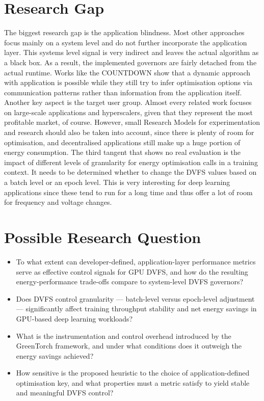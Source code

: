 \documentclass[12pt]{article}
\begin{document}
\section{Research Gap}
The biggest research gap is the application blindness. Most other approaches focus mainly on a system level and do not further incorporate the application layer. This systems level signal is very indirect and leaves the actual algorithm as a black box. As a result, the implemented governors are fairly detached from the actual runtime. Works like the COUNTDOWN show that a dynamic approach with application is possible while they still try to infer optimisation options via communication patterns rather than information from the application itself.\newline
Another key aspect is the target user group. Almost every related work focuses on large-scale applications and hyperscalers, given that they represent the most profitable market, of course. However, small Research Models for experimentation and research should also be taken into account, since there is plenty of room for optimisation, and decentralised applications still make up a huge portion of energy consumption.
\newline
The third tangent that shows no real evaluation is the impact of different levels of granularity for energy optimisation calls in a training context. It needs to be determined whether to change the DVFS values based on a batch level or an epoch level. This is very interesting for deep learning applications since these tend to run for a long time and thus offer a lot of room for frequency and voltage changes. 

\section{Possible Research Question}
 \begin{itemize}
     \item To what extent can developer-defined, application-layer performance metrics serve as effective control signals for GPU DVFS, and how do the resulting energy-performance trade-offs compare to system-level DVFS governors?
     \item Does DVFS control granularity — batch-level versus epoch-level adjustment — significantly affect training throughput stability and net energy savings in GPU-based deep learning workloads?
     \item What is the instrumentation and control overhead introduced by the GreenTorch framework, and under what conditions does it outweigh the energy savings achieved?
     \item How sensitive is the proposed heuristic to the choice of application-defined optimisation key, and what properties must a metric satisfy to yield stable and meaningful DVFS control?
 \end{itemize}
\end{document}
